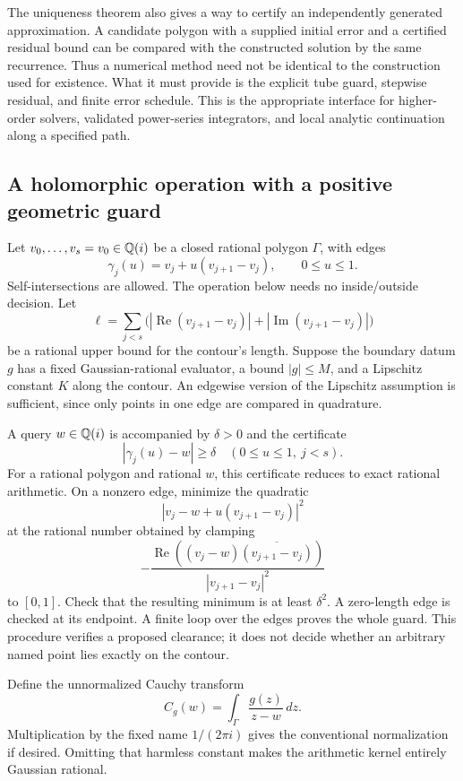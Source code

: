 The uniqueness theorem also gives a way to certify an independently generated approximation.  A candidate polygon with a supplied initial error and a certified residual bound can be compared with the constructed solution by the same recurrence.  Thus a numerical method need not be identical to the construction used for existence.  What it must provide is the explicit tube guard, stepwise residual, and finite error schedule.  This is the appropriate interface for higher-order solvers, validated power-series integrators, and local analytic continuation along a specified path.

\subsection{A holomorphic operation with a positive geometric guard}

Let $v_0,\ldots,v_s=v_0\in\mathbb Q(i)$ be a closed rational polygon $\Gamma$, with edges
\[
 \gamma_j(u)=v_j+u(v_{j+1}-v_j),\qquad 0\le u\le1.
\]
Self-intersections are allowed.  The operation below needs no inside/outside decision.  Let
\[
 \ell=\sum_{j<s}\bigl(|\operatorname{Re}(v_{j+1}-v_j)|+
                            |\operatorname{Im}(v_{j+1}-v_j)|\bigr)
\]
be a rational upper bound for the contour's length.  Suppose the boundary datum $g$ has a fixed Gaussian-rational evaluator, a bound $|g|\le M$, and a Lipschitz constant $K$ along the contour.  An edgewise version of the Lipschitz assumption is sufficient, since only points in one edge are compared in quadrature.

A query $w\in\mathbb Q(i)$ is accompanied by $\delta>0$ and the certificate
\begin{equation}
 |\gamma_j(u)-w|\ge\delta
 \quad(0\le u\le1,\ j<s).\label{eq:analytic-clearance}
\end{equation}
For a rational polygon and rational $w$, this certificate reduces to exact rational arithmetic.  On a nonzero edge, minimize the quadratic
\[
 |v_j-w+u(v_{j+1}-v_j)|^2
\]
at the rational number obtained by clamping
\[
 -\frac{\operatorname{Re}((v_j-w)\overline{(v_{j+1}-v_j)})}
 {|v_{j+1}-v_j|^2}
\]
to $[0,1]$.  Check that the resulting minimum is at least $\delta^2$.  A zero-length edge is checked at its endpoint.  A finite loop over the edges proves the whole guard.  This procedure verifies a proposed clearance; it does not decide whether an arbitrary named point lies exactly on the contour.

Define the unnormalized Cauchy transform
\[
 C_g(w)=\int_\Gamma\frac{g(z)}{z-w}\,dz.
\]
Multiplication by the fixed name $1/(2\pi i)$ gives the conventional normalization if desired.  Omitting that harmless constant makes the arithmetic kernel entirely Gaussian rational.


